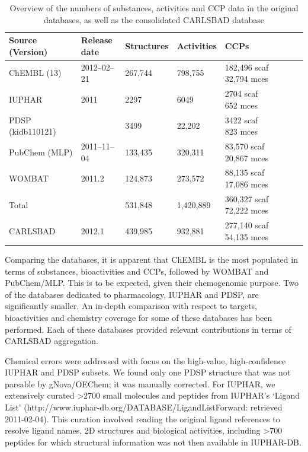 \begin{table}
\caption{Overview of the numbers of substances, activities and CCP data in the original databases, as well as the consolidated CARLSBAD database}
\label{tab:cb_02}
\centering
\begin{tabular}{p{0.25\linewidth}p{0.15\linewidth}p{0.15\linewidth}p{0.15\linewidth}p{0.30\linewidth}}
\hline
\textbf{Source (Version)} & \textbf{Release date} & \textbf{Structures} & \textbf{Activities} & \textbf{CCPs}\\
\hline
ChEMBL (13) & 2012–02–21 & 267,744 & 798,755 & \makecell[l]{182,496 scaf\\ 32,794 mces}\\
IUPHAR & 2011 & 2297 & 6049 & \makecell[l]{2704 scaf\\ 652 mces}\\
PDSP (kidb110121) & & 3499 & 22,202 & \makecell[l]{3422 scaf\\ 823 mces}\\
PubChem (MLP) & 2011–11–04 & 133,435 & 320,311 & \makecell[l]{83,570 scaf\\ 20,867 mces}\\
WOMBAT & 2011.2 & 124,873  & 273,572 & \makecell[l]{88,135 scaf\\ 17,086 mces}\\
\hline
Total & & 531,848 & 1,420,889 & \makecell[l]{360,327 scaf\\ 72,222 mces}\\
\hline
CARLSBAD & 2012.1 & 439,985 & 932,881 & \makecell[l]{277,140 scaf\\ 54,135 mces}\\
\hline
\end{tabular}
\end{table}

Comparing the databases, it is apparent that ChEMBL is the most populated in terms of substances, bioactivities and CCPs, followed by WOMBAT and PubChem/MLP. This is to be expected, given their chemogenomic purpose. Two of the databases dedicated to pharmacology, IUPHAR and PDSP, are significantly smaller. An in-depth comparison with respect to targets, bioactivities and chemistry coverage for some of these databases has been performed\cite{Tiikkainen2012-cw}. Each of these databases provided relevant contributions in terms of CARLSBAD aggregation.

Chemical errors were addressed with focus on the high-value, high-confidence IUPHAR and PDSP subsets. We found only one PDSP structure that was not parsable by gNova/OEChem; it was manually corrected. For IUPHAR, we extensively curated \textgreater 2700 small molecules and peptides from IUPHAR’s ‘Ligand List’ (http://www.iuphar-db.org/DATABASE/LigandListForward: retrieved 2011-02-04). This curation involved reading the original ligand references to resolve ligand names, 2D structures and biological activities, including \textgreater700 peptides for which structural information was not then available in IUPHAR-DB\cite{Harding2018-ut}. 

